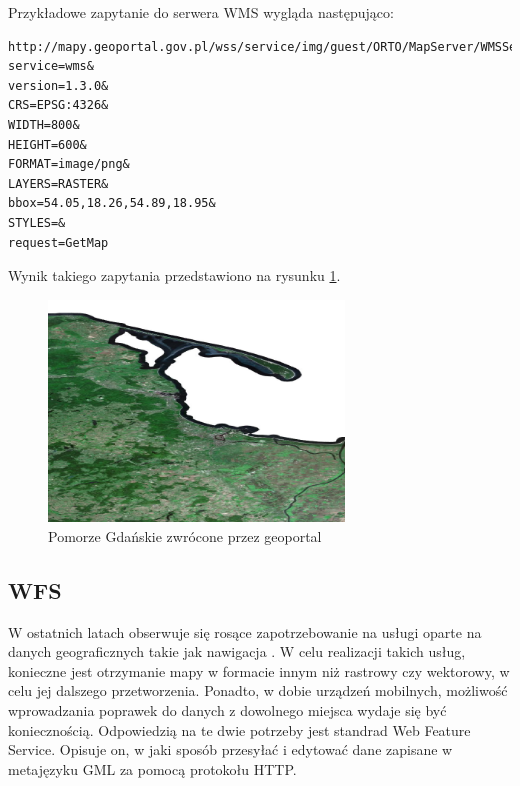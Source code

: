 Przykładowe zapytanie do serwera WMS wygląda następująco: 

\begin{lstlisting}[frame=single]
http://mapy.geoportal.gov.pl/wss/service/img/guest/ORTO/MapServer/WMSServer?
service=wms&
version=1.3.0&
CRS=EPSG:4326&
WIDTH=800&
HEIGHT=600&
FORMAT=image/png&
LAYERS=RASTER&
bbox=54.05,18.26,54.89,18.95&
STYLES=&
request=GetMap
\end{lstlisting}

Wynik takiego zapytania przedstawiono na rysunku \ref{fig:pomorze_gdanskie}.

\begin{figure}[h!]
    \label{fig:pomorze_gdanskie}
    \centering
    \includegraphics[width=0.7\textwidth]{img/pomorze_gdanskie.png}
    \caption{Pomorze Gdańskie zwrócone przez geoportal}
\end{figure}

\subsection{WFS}

W ostatnich latach obserwuje się rosące zapotrzebowanie na usługi oparte na danych geograficznych takie jak nawigacja \cite{TRZEBA_COS_ZNALEZC}.
W celu realizacji takich usług, konieczne jest otrzymanie mapy w formacie innym niż rastrowy czy wektorowy, w celu jej dalszego przetworzenia.
Ponadto, w dobie urządzeń mobilnych, możliwość wprowadzania poprawek do danych z dowolnego miejsca wydaje się być koniecznością.
Odpowiedzią na te dwie potrzeby jest standrad Web Feature Service.
Opisuje on, w jaki sposób przesyłać i edytować dane zapisane w metajęzyku GML za pomocą protokołu HTTP.

